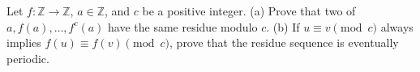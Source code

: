 Let $f:\mathbb Z\to\mathbb Z$, $a\in\mathbb Z$, and $c$ be a positive integer. (a) Prove that two of $a,f(a),\ldots,f^c(a)$ have the same residue modulo $c$. (b) If $u\equiv v\pmod c$ always implies $f(u)\equiv f(v)\pmod c$, prove that the residue sequence is eventually periodic.
